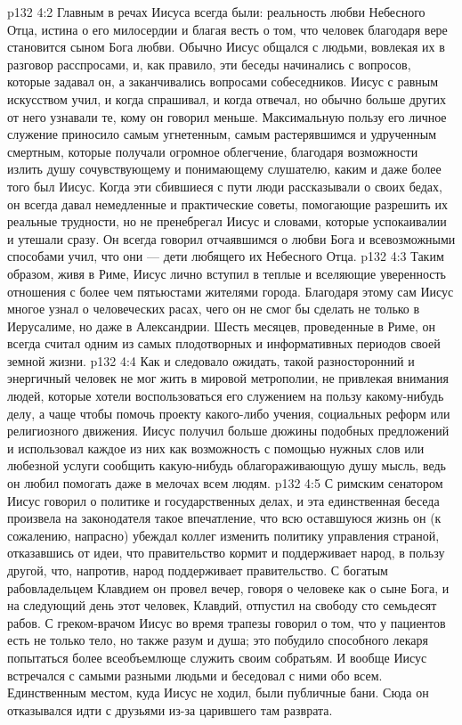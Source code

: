 \vs p132 4:2 Главным в речах Иисуса всегда были: реальность любви Небесного Отца, истина о его милосердии и благая весть о том, что человек благодаря вере становится сыном Бога любви. Обычно Иисус общался с людьми, вовлекая их в разговор расспросами, и, как правило, эти беседы начинались с вопросов, которые задавал он, а заканчивались вопросами собеседников. Иисус с равным искусством учил, и когда спрашивал, и когда отвечал, но обычно больше других от него узнавали те, кому он говорил меньше. Максимальную пользу его личное служение приносило самым угнетенным, самым растерявшимся и удрученным смертным, которые получали огромное облегчение, благодаря возможности излить душу сочувствующему и понимающему слушателю, каким и даже более того был Иисус. Когда эти сбившиеся с пути люди рассказывали о своих бедах, он всегда давал немедленные и практические советы, помогающие разрешить их реальные трудности, но не пренебрегал Иисус и словами, которые успокаивалии и утешали сразу. Он всегда говорил отчаявшимся о любви Бога и всевозможными способами учил, что они --- дети любящего их Небесного Отца.
\vs p132 4:3 Таким образом, живя в Риме, Иисус лично вступил в теплые и вселяющие уверенность отношения с более чем пятьюстами жителями города. Благодаря этому сам Иисус многое узнал о человеческих расах, чего он не смог бы сделать не только в Иерусалиме, но даже в Александрии. Шесть месяцев, проведенные в Риме, он всегда считал одним из самых плодотворных и информативных периодов своей земной жизни.
\vs p132 4:4 Как и следовало ожидать, такой разносторонний и энергичный человек не мог жить в мировой метрополии, не привлекая внимания людей, которые хотели воспользоваться его служением на пользу какому\hyp{}нибудь делу, а чаще чтобы помочь проекту какого\hyp{}либо учения, социальных реформ или религиозного движения. Иисус получил больше дюжины подобных предложений и использовал каждое из них как возможность с помощью нужных слов или любезной услуги сообщить какую\hyp{}нибудь облагораживающую душу мысль, ведь он любил помогать даже в мелочах всем людям.
\vs p132 4:5 \pc С римским сенатором Иисус говорил о политике и государственных делах, и эта единственная беседа произвела на законодателя такое впечатление, что всю оставшуюся жизнь он (к сожалению, напрасно) убеждал коллег изменить политику управления страной, отказавшись от идеи, что правительство кормит и поддерживает народ, в пользу другой, что, напротив, народ поддерживает правительство. С богатым рабовладельцем Клавдием он провел вечер, говоря о человеке как о сыне Бога, и на следующий день этот человек, Клавдий, отпустил на свободу сто семьдесят рабов. С греком\hyp{}врачом Иисус во время трапезы говорил о том, что у пациентов есть не только тело, но также разум и душа; это побудило способного лекаря попытаться более всеобъемлюще служить своим собратьям. И вообще Иисус встречался с самыми разными людьми и беседовал с ними обо всем. Единственным местом, куда Иисус не ходил, были публичные бани. Сюда он отказывался идти с друзьями из\hyp{}за царившего там разврата.
